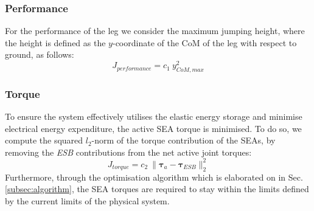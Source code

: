 \documentclass[letterpaper, 10 pt, conference]{ieeeconf}  %
\begin{document}
\subsubsection{Performance}
For the performance of the leg we consider the maximum jumping height, where the height is defined as the $y$-coordinate of the CoM of the leg with respect to ground, as follows:
\begin{equation}
	J_{performance} = c_1 \: y_{CoM,max}^2
\end{equation}


\subsubsection{Torque}
To ensure the system effectively utilises the elastic energy storage and minimise electrical energy expenditure, the active SEA torque is minimised. To do so, we compute the squared $l_2$-norm of the torque contribution of the SEAs, by removing the \textit{ESB} contributions from the net active joint torques:
\begin{equation}
	J_{torque}= c_2 \: \| \boldsymbol{\tau}_a - \boldsymbol{\tau}_{ESB} \|_2^2
\end{equation}
Furthermore, through the optimisation algorithm which is elaborated on in Sec. \ref{subsec:algorithm}, the SEA torques are required to stay within the limits defined by the current limits of the physical system.
\end{document}
